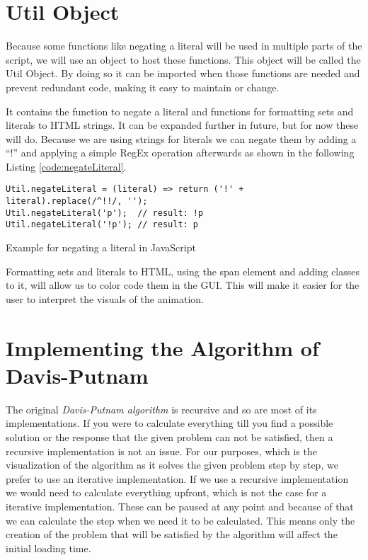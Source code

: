 \section{Util Object}
\label{sec:impUtil}
Because some functions like negating a literal will be used in multiple parts of the script, we will use an object to host these functions. This object will be called the Util Object. By doing so it can be imported when those functions are needed and prevent redundant code, making it easy to maintain or change.

It contains the function to negate a literal and functions for formatting sets and literals to HTML strings. It can be expanded further in future, but for now these will do.
Because we are using strings for literals we can negate them by adding a ``!'' and applying a simple RegEx operation afterwards as shown in the following Listing \ref{code:negateLiteral}.

\begin{listing}[H]
\begin{verbatim}
Util.negateLiteral = (literal) => return ('!' + literal).replace(/^!!/, '');
Util.negateLiteral('p');  // result: !p
Util.negateLiteral('!p'); // result: p
\end{verbatim}
    \caption{Example for negating a literal in JavaScript}
    \label{code:negateLiteral}
\end{listing}

Formatting sets and literals to HTML, using the span element and adding classes to it, will allow us to color code them in the GUI. This will make it easier for the user to interpret the visuals of the animation.

\section{Implementing the Algorithm of Davis-Putnam}
\label{sec:impDavisPutnam}
The original \textit{Davis-Putnam algorithm} is recursive and so are most of its implementations. If you were to calculate everything till you find a possible solution or the response that the given problem can not be satisfied, then a recursive implementation is not an issue. For our purposes, which is the visualization of the algorithm as it solves the given problem step by step, we prefer to use an iterative implementation. If we use a recursive implementation we would need to calculate everything upfront, which is not the case for a iterative implementation. These can be paused at any point and because of that we can calculate the step when we need it to be calculated. This means only the creation of the problem that will be satisfied by the algorithm will affect the initial loading time.

